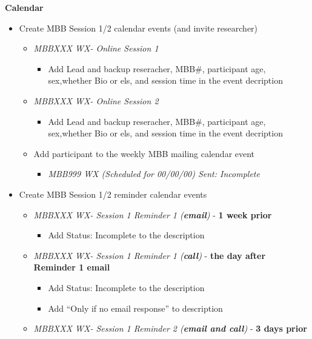 \documentclass[]{book}
\providecommand{\tightlist}{%
  \setlength{\itemsep}{0pt}\setlength{\parskip}{0pt}}
\begin{document}
\textbf{Calendar}

\begin{itemize}
\tightlist
\item
  Create MBB Session 1/2 calendar events (and invite researcher)

  \begin{itemize}
  \tightlist
  \item
    \emph{MBBXXX WX- Online Session 1}

    \begin{itemize}
    \tightlist
    \item
      Add Lead and backup reseracher, MBB\#, participant age, sex,whether Bio or els, and session time in the event decription
    \end{itemize}
  \item
    \emph{MBBXXX WX- Online Session 2}

    \begin{itemize}
    \tightlist
    \item
      Add Lead and backup reseracher, MBB\#, participant age, sex,whether Bio or els, and session time in the event decription
    \end{itemize}
  \item
    Add participant to the weekly MBB mailing calendar event

    \begin{itemize}
    \tightlist
    \item
      \emph{MBB999 WX (Scheduled for 00/00/00) Sent: Incomplete}
    \end{itemize}
  \end{itemize}
\item
  Create MBB Session 1/2 reminder calendar events

  \begin{itemize}
  \tightlist
  \item
    \emph{MBBXXX WX- Session 1 Reminder 1 (\textbf{email})} - \textbf{1 week prior}

    \begin{itemize}
    \tightlist
    \item
      Add Status: Incomplete to the description
    \end{itemize}
  \item
    \emph{MBBXXX WX- Session 1 Reminder 1 (\textbf{call})} - \textbf{the day after Reminder 1 email}

    \begin{itemize}
    \tightlist
    \item
      Add Status: Incomplete to the description
    \item
      Add ``Only if no email response'' to description
    \end{itemize}
  \item
    \emph{MBBXXX WX- Session 1 Reminder 2 (\textbf{email and call})} - \textbf{3 days prior}


\end{itemize}
\end{itemize}
\end{document}
